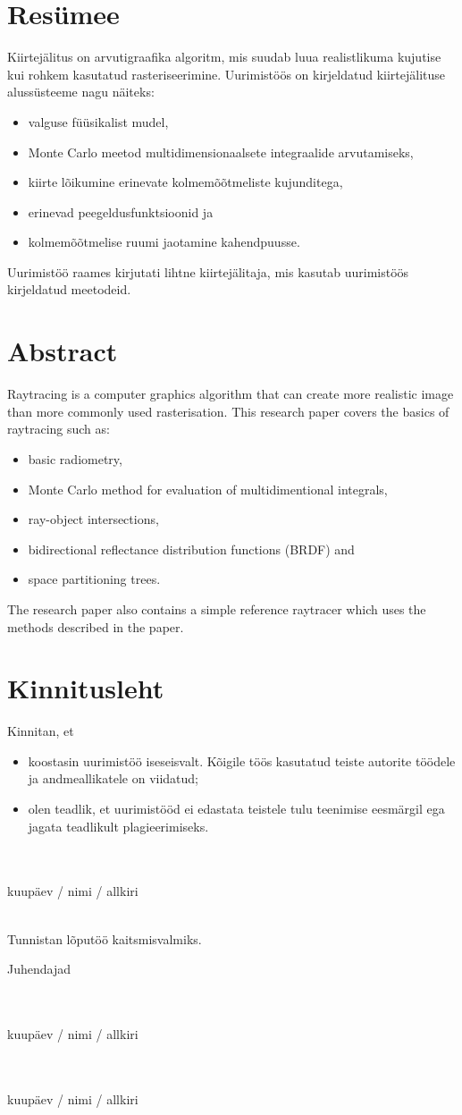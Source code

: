 \documentclass[a4paper,12pt]{report}
\begin{document}
\chapter*{Resümee}
Kiirtejälitus on arvutigraafika algoritm, mis suudab luua realistlikuma
kujutise kui rohkem kasutatud rasteriseerimine. Uurimistöös on kirjeldatud
kiirtejälituse alussüsteeme nagu näiteks:
\begin{itemize}
\item valguse füüsikalist mudel,
\item Monte Carlo meetod multidimensionaalsete integraalide arvutamiseks,
\item kiirte lõikumine erinevate kolmemõõtmeliste kujunditega,
\item erinevad peegeldusfunktsioonid ja
\item kolmemõõtmelise ruumi jaotamine kahendpuusse.
\end{itemize}

Uurimistöö raames kirjutati lihtne kiirtejälitaja, mis kasutab uurimistöös
kirjeldatud meetodeid.

\chapter*{Abstract}
Raytracing is a computer graphics algorithm that can create more realistic
image than more commonly used rasterisation. This research paper covers
the basics of raytracing such as:
\begin{itemize}
\item basic radiometry,
\item Monte Carlo method for evaluation of multidimentional integrals,
\item ray-object intersections,
\item bidirectional reflectance distribution functions (BRDF) and
\item space partitioning trees.
\end{itemize}

The research paper also contains a simple reference raytracer which uses
the methods described in the paper.

\chapter*{Kinnitusleht}
Kinnitan, et
\begin{itemize}
\item koostasin uurimistöö iseseisvalt. Kõigile töös kasutatud teiste autorite töödele ja
andmeallikatele on viidatud;
\item olen teadlik, et uurimistööd ei edastata teistele tulu teenimise eesmärgil ega jagata
teadlikult plagieerimiseks.
\end{itemize}

\flushleft
~\\\dotfill\\
kuupäev / nimi / allkiri

~\\

Tunnistan lõputöö kaitsmisvalmiks.

Juhendajad

\flushleft
~\\\dotfill\\
kuupäev / nimi / allkiri

\flushleft
~\\\dotfill\\
kuupäev / nimi / allkiri
\end{document}
